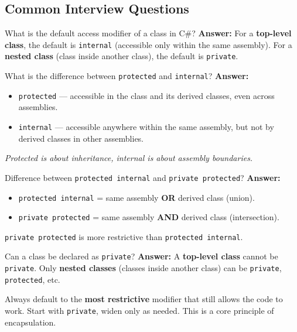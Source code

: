 \documentclass[11pt,a4paper]{article}
\begin{document}
\subsection{Common Interview Questions}

\begin{intqBox}{What is the default access modifier of a class in C\#?}
\textbf{Answer:} For a \textbf{top-level class}, the default is \texttt{internal} (accessible only within the same assembly). For a \textbf{nested class} (class inside another class), the default is \texttt{private}.
\end{intqBox}

\begin{intqBox}{What is the difference between \texttt{protected} and \texttt{internal}?}
\textbf{Answer:}
\begin{itemize}[leftmargin=*]
    \item \texttt{protected} — accessible in the class and its derived classes, even across assemblies.
    \item \texttt{internal} — accessible anywhere within the same assembly, but not by derived classes in other assemblies.
\end{itemize}
\textit{Protected is about inheritance, internal is about assembly boundaries.}
\end{intqBox}

\begin{intqBox}{Difference between \texttt{protected internal} and \texttt{private protected}?}
\textbf{Answer:}
\begin{itemize}[leftmargin=*]
    \item \texttt{protected internal} = same assembly \textbf{OR} derived class (union).
    \item \texttt{private protected} = same assembly \textbf{AND} derived class (intersection).
\end{itemize}
\texttt{private protected} is more restrictive than \texttt{protected internal}.
\end{intqBox}

\begin{intqBox}{Can a class be declared as \texttt{private}?}
\textbf{Answer:} A \textbf{top-level class} cannot be \texttt{private}. Only \textbf{nested classes} (classes inside another class) can be \texttt{private}, \texttt{protected}, etc.
\end{intqBox}

\begin{tipBox}
Always default to the \textbf{most restrictive} modifier that still allows the code to work. Start with \texttt{private}, widen only as needed. This is a core principle of encapsulation.
\end{tipBox}
\end{document}
